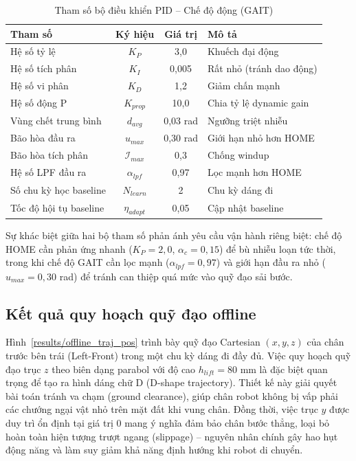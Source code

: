 \begin{table}[H]
\centering
\caption{Tham số bộ điều khiển PID -- Chế độ động (GAIT)}
\label{tab:pid_gait_params}
\renewcommand{\arraystretch}{1.3}
\begin{tabular}{|l|c|c|l|}
\hline
\textbf{Tham số} & \textbf{Ký hiệu} & \textbf{Giá trị} & \textbf{Mô tả} \\ \hline
Hệ số tỷ lệ & $K_P$ & 3,0 & Khuếch đại động \\ \hline
Hệ số tích phân & $K_I$ & 0,005 & Rất nhỏ (tránh dao động) \\ \hline
Hệ số vi phân & $K_D$ & 1,2 & Giảm chấn mạnh \\ \hline
Hệ số động P & $K_{prop}$ & 10,0 & Chia tỷ lệ dynamic gain \\ \hline
Vùng chết trung bình & $d_{avg}$ & 0,03 rad & Ngưỡng triệt nhiễu \\ \hline
Bão hòa đầu ra & $u_{max}$ & 0,30 rad & Giới hạn nhỏ hơn HOME \\ \hline
Bão hòa tích phân & $\mathcal{I}_{max}$ & 0,3 & Chống windup \\ \hline
Hệ số LPF đầu ra & $\alpha_{lpf}$ & 0,97 & Lọc mạnh hơn HOME \\ \hline
Số chu kỳ học baseline & $N_{learn}$ & 2 & Chu kỳ dáng đi \\ \hline
Tốc độ hội tụ baseline & $\eta_{adapt}$ & 0,05 & Cập nhật baseline \\ \hline
\end{tabular}
\end{table}

Sự khác biệt giữa hai bộ tham số phản ánh yêu cầu vận hành riêng biệt: chế độ HOME cần phản ứng nhanh ($K_P = 2{,}0$, $\alpha_c = 0{,}15$) để bù nhiễu loạn tức thời, trong khi chế độ GAIT cần lọc mạnh ($\alpha_{lpf} = 0{,}97$) và giới hạn đầu ra nhỏ ($u_{max} = 0{,}30$ rad) để tránh can thiệp quá mức vào quỹ đạo sải bước.

\subsection{Kết quả quy hoạch quỹ đạo offline}

Hình~\ref{results/offline_traj_pos} trình bày quỹ đạo Cartesian $(x, y, z)$ của chân trước bên trái (Left-Front) trong một chu kỳ dáng đi đầy đủ. Việc quy hoạch quỹ đạo trục $z$ theo biên dạng parabol với độ cao $h_{lift} = 80$ mm là đặc biệt quan trọng để tạo ra hình dáng chữ D (D-shape trajectory). Thiết kế này giải quyết bài toán tránh va chạm (ground clearance), giúp chân robot không bị vấp phải các chướng ngại vật nhỏ trên mặt đất khi vung chân. Đồng thời, việc trục $y$ được duy trì ổn định tại giá trị $0$ mang ý nghĩa đảm bảo chân bước thẳng, loại bỏ hoàn toàn hiện tượng trượt ngang (slippage) -- nguyên nhân chính gây hao hụt động năng và làm suy giảm khả năng định hướng khi robot di chuyển.

